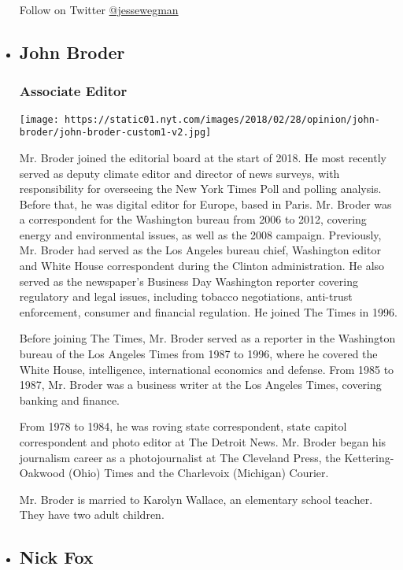 \begin{itemize}
  Follow on Twitter \href{http://twitter.com/jessewegman}{@jessewegman}
\item
  \hypertarget{john-broder}{%
  \subsection{John Broder}\label{john-broder}}

  \hypertarget{associate-editor}{%
  \subsubsection{Associate Editor}\label{associate-editor}}

  \texttt{[image: https://static01.nyt.com/images/2018/02/28/opinion/john-broder/john-broder-custom1-v2.jpg]}

  Mr. Broder joined the editorial board at the start of 2018. He most
  recently served as deputy climate editor and director of news surveys,
  with responsibility for overseeing the New York Times Poll and polling
  analysis. Before that, he was digital editor for Europe, based in
  Paris. Mr. Broder was a correspondent for the Washington bureau from
  2006 to 2012, covering energy and environmental issues, as well as the
  2008 campaign. Previously, Mr. Broder had served as the Los Angeles
  bureau chief, Washington editor and White House correspondent during
  the Clinton administration. He also served as the newspaper's Business
  Day Washington reporter covering regulatory and legal issues,
  including tobacco negotiations, anti-trust enforcement, consumer and
  financial regulation. He joined The Times in 1996.

  Before joining The Times, Mr. Broder served as a reporter in the
  Washington bureau of the Los Angeles Times from 1987 to 1996, where he
  covered the White House, intelligence, international economics and
  defense. From 1985 to 1987, Mr. Broder was a business writer at the
  Los Angeles Times, covering banking and finance.

  From 1978 to 1984, he was roving state correspondent, state capitol
  correspondent and photo editor at The Detroit News. Mr. Broder began
  his journalism career as a photojournalist at The Cleveland Press, the
  Kettering-Oakwood (Ohio) Times and the Charlevoix (Michigan) Courier.

  Mr. Broder is married to Karolyn Wallace, an elementary school
  teacher. They have two adult children.
\item
  \hypertarget{nick-fox}{%
  \subsection{Nick Fox}\label{nick-fox}}


\end{itemize}
